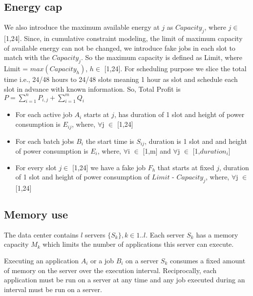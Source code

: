 \documentclass[a4paper]{article}
\begin{document}
\subsection{Energy cap}

We also introduce the maximum available energy at $j$ as $Capacity_j$, where $j\in$ [1,24]. Since, in cumulative constraint modeling, the limit of maximum capacity of available energy can not be changed, we introduce fake jobs in each slot to match with the $Capacity_j$. So the maximum capacity is defined as Limit, where Limit = $max (Capacity_{h})$, ${h}\in$ [1,24]. For scheduling purpose we slice the total time i.e., 24/48 hours to 24/48 slots meaning 1 hour as slot and schedule each slot in advance with known information. So, Total Profit is $P=\sum_{i=1}^{n} {P_{i,j}} + \sum_{i=1}^{m} {Q_i}$
 
\begin{itemize}
\item For each active job $A_{i}$ starts at $j$, has duration of 1 slot and height of power consumption is $E_{ij}$, where, $\forall$j $\in$ [1,24]
\end{itemize}

\begin{itemize}
\item For each batch jobs $B_{i}$ the start time is $S_{ij}$, duration is 1 slot and and height of power consumption is $E_{i}$, where, $\forall$i $\in$ [1,m] and $\forall$j $\in$ [1,$duration_i$]
\end{itemize}

\begin{itemize}
\item  For every slot ${j}\in$ [1,24] we have a fake job $F_{h}$ that starts at fixed $j$, duration of 1 slot and height of power consumption of $Limit$ - $Capacity_j$, where, $\forall$j $\in$ [1,24]
\end{itemize}

\subsection{Memory use}

The data center contains $l$ servers $\{S_k\}, k\in 1..l$. Each server $S_k$ has a memory capacity $M_k$ which limits the number of applications this server can execute.

Executing an application $A_i$ or a job $B_i$ on a server $S_k$ consumes a fixed amount of memory 
on the server over the execution interval. Reciprocally, each application must be run on a server at any time and any job executed during an interval must be run on a server.
\end{document}
